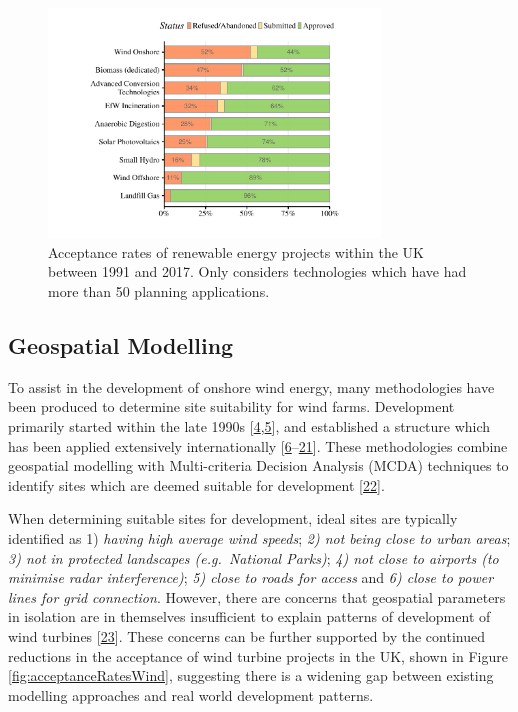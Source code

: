 \documentclass[a4paper,]{article}
\theoremstyle{definition}
\theoremstyle{definition}
\theoremstyle{definition}
\theoremstyle{remark}
\begin{document}
\begin{figure}[h]

{\centering \includegraphics[width=8.8cm]{Wind_Stats_Paper_files/figure-latex/acceptanceRates-1} 

}

\caption{Acceptance rates of renewable energy projects within the UK between 1991 and 2017. Only considers technologies which have had more than 50 planning applications.}\label{fig:acceptanceRates}
\end{figure}

\subsection{Geospatial Modelling}\label{geospatial-modelling}

To assist in the development of onshore wind energy, many methodologies
have been produced to determine site suitability for wind farms.
Development primarily started within the late 1990s
{[}\protect\hyperlink{ref-Voivontas1998}{4},\protect\hyperlink{ref-Baban2001}{5}{]},
and established a structure which has been applied extensively
internationally
{[}\protect\hyperlink{ref-Hansen2005}{6}--\protect\hyperlink{ref-Baseer2017}{21}{]}.
These methodologies combine geospatial modelling with Multi-criteria
Decision Analysis (MCDA) techniques to identify sites which are deemed
suitable for development
{[}\protect\hyperlink{ref-Malczewski2004}{22}{]}.

When determining suitable sites for development, ideal sites are
typically identified as 1) \emph{having high average wind speeds};
\emph{2) not being close to urban areas}; \emph{3) not in protected
landscapes (e.g.~National Parks)}; \emph{4) not close to airports (to
minimise radar interference)}; \emph{5) close to roads for access} and
\emph{6) close to power lines for grid connection}. However, there are
concerns that geospatial parameters in isolation are in themselves
insufficient to explain patterns of development of wind turbines
{[}\protect\hyperlink{ref-VanderHorst2010}{23}{]}. These concerns can be
further supported by the continued reductions in the acceptance of wind
turbine projects in the UK, shown in Figure
\ref{fig:acceptanceRatesWind}, suggesting there is a widening gap
between existing modelling approaches and real world development
patterns.
\end{document}
